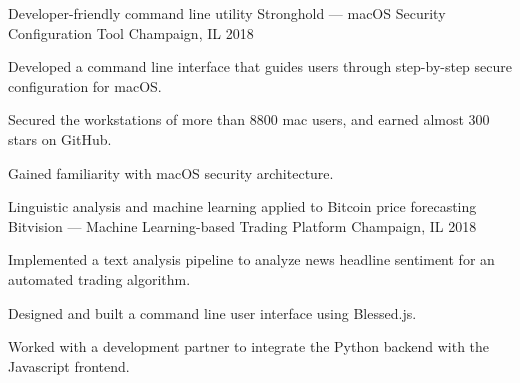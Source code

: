 

\begin{cventries}
\cventry
{Developer-friendly command line utility} %
{Stronghold — macOS Security Configuration Tool} %
{Champaign, IL} %
{2018} %
{
	\begin{cvitems} %
		\item {Developed a command line interface that guides users through step-by-step secure configuration for macOS.}
		\item {Secured the workstations of more than 8800 mac users, and earned almost 300 stars on GitHub.}
		\item{Gained familiarity with macOS security architecture.} 
	\end{cvitems}
}
\cventry
{Linguistic analysis and machine learning applied to Bitcoin price forecasting} %
{Bitvision — Machine Learning-based Trading Platform} %
{Champaign, IL} %
{2018} %
{
	\begin{cvitems} %
		\item {Implemented a text analysis pipeline to analyze news headline sentiment for an automated trading algorithm.}
		\item {Designed and built a command line user interface using Blessed.js.}
		\item {Worked with a development partner to integrate the Python backend with the Javascript frontend.}
	\end{cvitems}
}


\end{cventries}
